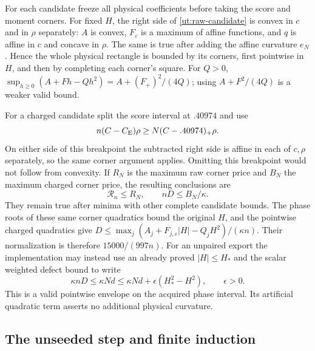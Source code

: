 For each candidate freeze all physical coefficients before taking the
score and moment corners. For fixed $H$, the right side of
\eqref{ut:raw-candidate} is convex in $c$ and in $\rho$ separately:
$A$ is convex, $F_\varepsilon$ is a maximum of affine functions,
and $q$ is affine in $c$ and concave in $\rho$.
The same is true after adding the affine curvature $e_N$.
Hence the whole physical rectangle is bounded by its corners, first
pointwise in $H$, and then by completing each corner's square.
For $Q>0$, $\sup_{h\ge0}(A+Fh-Qh^2)=A+(F_+)^2/(4Q)$;
using $A+F^2/(4Q)$ is a weaker valid bound.

For a charged candidate split the score interval at $.40974$ and use
\begin{equation}\label{ut:excess-charge}
 n(C-C_{\mathrm E})\rho\ge N(C-.40974)_+\rho.
\end{equation}
On either side of this breakpoint the subtracted right side is
affine in each of $c,\rho$ separately, so the same corner argument
applies. Omitting this breakpoint would not follow from convexity.
If $R_N$ is the maximum raw corner price and $B_N$ the maximum
charged corner price, the resulting conclusions are
\begin{equation}\label{ut:stage-output}
 \mathcal R_n\le R_N,\qquad nD\le B_N/\kappa.
\end{equation}
They remain true after minima with other complete candidate bounds.
The phase roots of these same corner quadratics bound the original
$H$, and the pointwise charged quadratics give
$D\le\max_j(A_j+F_{j,\varepsilon}|H|-Q_jH^2)/(\kappa n)$.
Their normalization is therefore $15000/(997n)$.
For an unpaired export the implementation may instead use an already
proved $|H|\le H_*$ and the scalar weighted defect bound to write
\[
 \kappa nD\le\kappa Nd
 \le\kappa Nd+\epsilon(H_*^2-H^2),\qquad\epsilon>0.
\]
This is a valid pointwise envelope on the acquired phase interval.
Its artificial quadratic term asserts no additional physical curvature.

\subsection{The unseeded step and finite induction}

